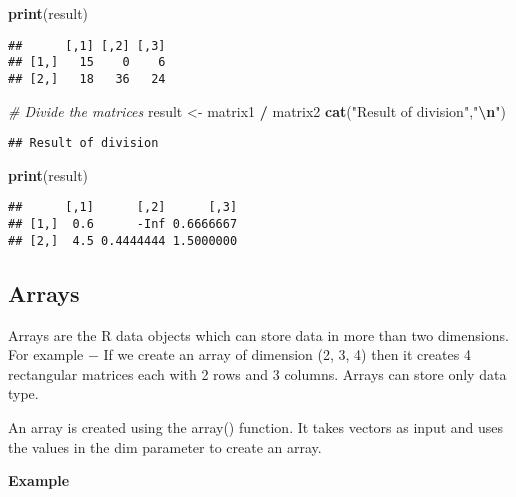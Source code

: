\documentclass[
]{article}
\newenvironment{Shaded}{\begin{snugshade}}{\end{snugshade}}
\newcommand{\CommentTok}[1]{\textcolor[rgb]{0.56,0.35,0.01}{\textit{#1}}}
\newcommand{\FunctionTok}[1]{\textcolor[rgb]{0.13,0.29,0.53}{\textbf{#1}}}
\newcommand{\NormalTok}[1]{#1}
\newcommand{\OtherTok}[1]{\textcolor[rgb]{0.56,0.35,0.01}{#1}}
\newcommand{\SpecialCharTok}[1]{\textcolor[rgb]{0.81,0.36,0.00}{\textbf{#1}}}
\newcommand{\StringTok}[1]{\textcolor[rgb]{0.31,0.60,0.02}{#1}}
\begin{document}
\begin{Shaded}
\begin{Highlighting}[]
\FunctionTok{print}\NormalTok{(result)}
\end{Highlighting}
\end{Shaded}

\begin{verbatim}
##      [,1] [,2] [,3]
## [1,]   15    0    6
## [2,]   18   36   24
\end{verbatim}

\begin{Shaded}
\begin{Highlighting}[]
\CommentTok{\# Divide the matrices}
\NormalTok{result }\OtherTok{\textless{}{-}}\NormalTok{ matrix1 }\SpecialCharTok{/}\NormalTok{ matrix2}
\FunctionTok{cat}\NormalTok{(}\StringTok{"Result of division"}\NormalTok{,}\StringTok{"}\SpecialCharTok{\textbackslash{}n}\StringTok{"}\NormalTok{)}
\end{Highlighting}
\end{Shaded}

\begin{verbatim}
## Result of division
\end{verbatim}

\begin{Shaded}
\begin{Highlighting}[]
\FunctionTok{print}\NormalTok{(result)}
\end{Highlighting}
\end{Shaded}

\begin{verbatim}
##      [,1]      [,2]      [,3]
## [1,]  0.6      -Inf 0.6666667
## [2,]  4.5 0.4444444 1.5000000
\end{verbatim}

\hypertarget{arrays}{%
\subsection{Arrays}\label{arrays}}

Arrays are the R data objects which can store data in more than two
dimensions. For example − If we create an array of dimension (2, 3, 4)
then it creates 4 rectangular matrices each with 2 rows and 3 columns.
Arrays can store only data type.

An array is created using the array() function. It takes vectors as
input and uses the values in the dim parameter to create an array.

\textbf{Example}
\end{document}
